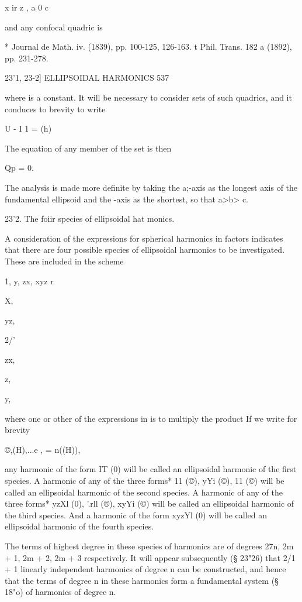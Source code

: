 x  ir z  , 
a  0  c 



and any confocal quadric is 



* Journal de Math. iv. (1839), pp. 100-125, 126-163. 
t Phil. Trans. 182 a (1892), pp. 231-278. 



23'1, 23-2] ELLIPSOIDAL HARMONICS 537 

where   is a constant. It will be necessary to consider sets of such quadrics, 
and it conduces to brevity to write 

U -  I 1 = (h) 

The equation of any member of the set is then 

Qp = 0. 

The analysis is made more definite by taking the a;-axis as the longest axis 
of the fundamental ellipsoid and the   -axis as the shortest, so that a>b> c. 

23'2. The foiir species of ellipsoidal hat monics. 

A consideration of the expressions for spherical harmonics in factors 
indicates that there are four possible species of ellipsoidal harmonics to be 
investigated. These are included in the scheme 



1, y, zx, xyz r%



X, 


yz, 


2/' 


zx, 


z, 


 y, 



where one or other of the expressions in     is to multiply the product 
If we write for brevity 

©,(H),...e , = n((H)), 

any harmonic of the form IT (0) will be called an ellipsoidal harmonic of the 
first species. A harmonic of any of the three forms*  11 (©), yYi (©),  11 (©) 
will be called an ellipsoidal harmonic of the second species. A harmonic of 
any of the three forms* yzXl (0),  '.rll (®), xyYi (©) will be called an ellipsoidal 
harmonic of the third species. And a harmonic of the form xyzYl (0) will be 
called an ellipsoidal harmonic of the fourth species. 

The terms of highest degree in these species of harmonics are of degrees 
27n, 2m + 1, 2m + 2, 2m + 3 respectively. It will appear subsequently (§ 23"26) 
that 2/1 + 1 linearly independent harmonics of degree n can be constructed, 
and hence that the terms of degree n in these harmonics form a fundamental 
system (§ 18"o) of harmonics of degree n. 

